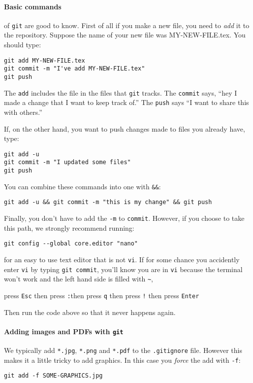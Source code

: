 \documentclass{ximera}
\begin{document}
\paragraph{Basic commands} of \verb!git! are good to know.
First of all if you make a new file, you need to \textit{add} it to the
repository. Suppose the name of your new file was MY-NEW-FILE.tex. You should
type:

\begin{verbatim}
git add MY-NEW-FILE.tex
git commit -m "I've add MY-NEW-FILE.tex"
git push
\end{verbatim}
The \verb!add! includes the file in the files that \verb!git! tracks. The
\verb!commit! says, ``hey I made a change that I want to keep track of.'' The
\verb!push! says ``I want to share this with others.''

If, on the other hand, you want to push changes made to files you already have,
type:
\begin{verbatim}
git add -u
git commit -m "I updated some files"
git push
\end{verbatim}
You can combine these commands into one with \verb!&&!:
\begin{verbatim}
git add -u && git commit -m "this is my change" && git push
\end{verbatim}

Finally, you don't have to add the \verb!-m! to \verb!commit!. However, if you
choose to take this path, we strongly recommend running:
\begin{verbatim}
git config --global core.editor "nano"
\end{verbatim}
for an easy to use text editor that is not \verb!vi!. If for some chance you
accidently enter \verb!vi! by typing \verb!git commit!, you'll know you are in
\verb!vi! because the terminal won't work and the left hand side is filled with
\verb!~!,
\begin{center}
    press \verb!Esc! \quad then press \verb!:!\quad then press \verb!q! \quad
    then
    press \verb#!# \quad then press \verb!Enter!
\end{center}
Then run the code above so that it never happens again.

\paragraph{Adding images and PDFs with \texttt{git}}

We typically add \verb!*.jpg!, \verb!*.png! and \verb!*.pdf! to the
\verb!.gitignore! file. However this makes it a little tricky to add graphics.
In this case you \textit{force} the add with \verb!-f!:
\begin{verbatim}
git add -f SOME-GRAPHICS.jpg
\end{verbatim}
\end{document}
